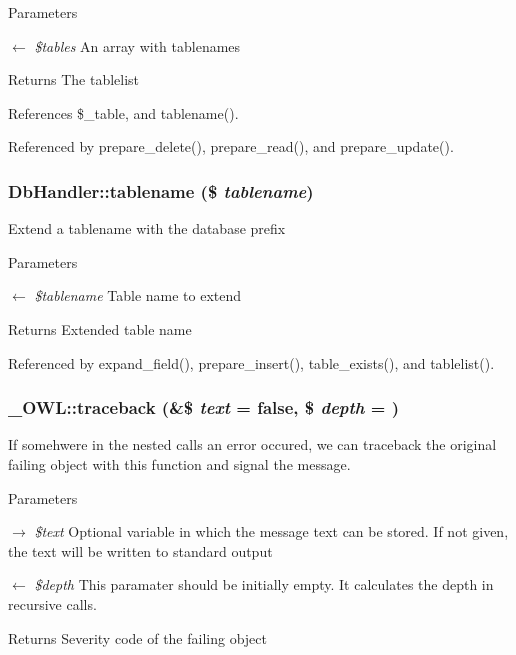 \begin{DoxyParams}{Parameters}
\item[\mbox{$\leftarrow$} {\em \$tables}]An array with tablenames \end{DoxyParams}
\begin{DoxyReturn}{Returns}
The tablelist 
\end{DoxyReturn}


References \$\_\-table, and tablename().



Referenced by prepare\_\-delete(), prepare\_\-read(), and prepare\_\-update().

\subsubsection[{tablename}]{\setlength{\rightskip}{0pt plus 5cm}DbHandler::tablename (\$ {\em tablename})}\label{classDbHandler_abaca15a312800e5522b3efd9dff036f5}
Extend a tablename with the database prefix


\begin{DoxyParams}{Parameters}
\item[\mbox{$\leftarrow$} {\em \$tablename}]Table name to extend \end{DoxyParams}
\begin{DoxyReturn}{Returns}
Extended table name 
\end{DoxyReturn}


Referenced by expand\_\-field(), prepare\_\-insert(), table\_\-exists(), and tablelist().

\subsubsection[{traceback}]{\setlength{\rightskip}{0pt plus 5cm}\_\-OWL::traceback (\&\$ {\em text} = {\ttfamily false}, \/  \$ {\em depth} = {})}\label{class__OWL_aa29547995d6741b7d2b90c1d4ea99a13}
If somehwere in the nested calls an error occured, we can traceback the original failing object with this function and signal the message.


\begin{DoxyParams}{Parameters}
\item[\mbox{$\rightarrow$} {\em \$text}]Optional variable in which the message text can be stored. If not given, the text will be written to standard output \item[\mbox{$\leftarrow$} {\em \$depth}]This paramater should be initially empty. It calculates the depth in recursive calls. \end{DoxyParams}
\begin{DoxyReturn}{Returns}
Severity code of the failing object 
\end{DoxyReturn}


